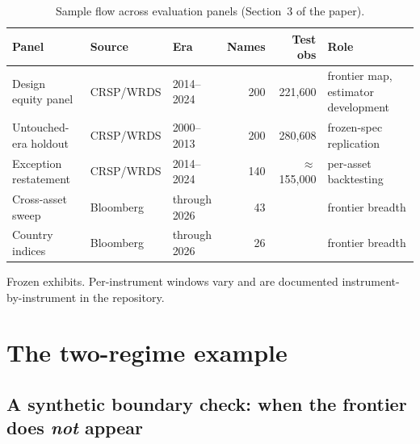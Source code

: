 \documentclass[11pt]{article}
\begin{document}
\begin{table}[h]
\centering\small
\begin{threeparttable}
\caption{Sample flow across evaluation panels (Section~3 of the paper).}
\label{tab:sampleflow}
\footnotesize\setlength{\tabcolsep}{4pt}
\begin{tabular}{lllrrl}
\toprule
Panel & Source & Era & Names & Test obs & Role \\
\midrule
Design equity panel & CRSP/WRDS & 2014--2024 & 200 & 221{,}600 & frontier map, estimator development \\
Untouched-era holdout & CRSP/WRDS & 2000--2013 & 200 & 280{,}608 & frozen-spec replication \\
Exception restatement & CRSP/WRDS & 2014--2024 & 140 & $\approx$155{,}000 & per-asset backtesting \\
Cross-asset sweep & Bloomberg & through 2026 & 43 & \tnote{a} & frontier breadth \\
Country indices & Bloomberg & through 2026 & 26 & \tnote{a} & frontier breadth \\
\bottomrule
\end{tabular}
\begin{tablenotes}\footnotesize
\item[a] Frozen exhibits. Per-instrument windows vary and are documented instrument-by-instrument in the repository.
\end{tablenotes}
\end{threeparttable}
\end{table}

\section{The two-regime example}
\subsection*{A synthetic boundary check: when the frontier does
\emph{not} appear}\label{sec:toy}
\end{document}
